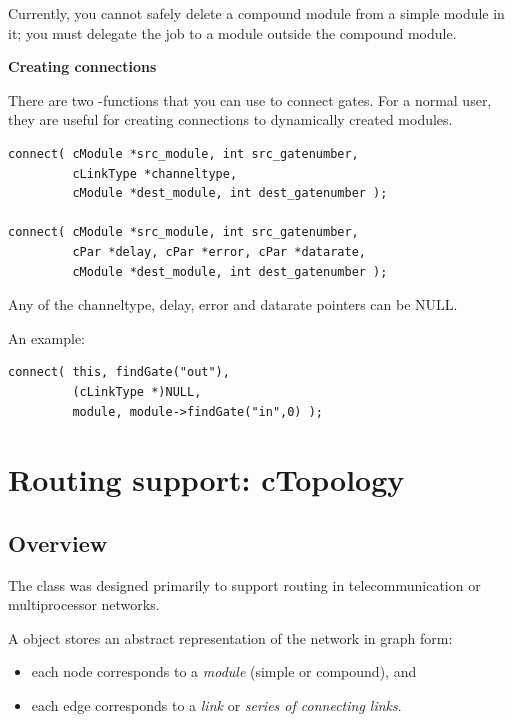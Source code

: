 Currently, you cannot safely delete a
compound module from a simple module
in it; you must delegate the job to a module outside the compound
module.


\textbf{Creating connections}


There are two -functions that you can use to connect
gates. For a normal user, they are useful for creating connections to
dynamically created modules.

\begin{Verbatim}
connect( cModule *src_module, int src_gatenumber,
         cLinkType *channeltype,
         cModule *dest_module, int dest_gatenumber );

connect( cModule *src_module, int src_gatenumber,
         cPar *delay, cPar *error, cPar *datarate,
         cModule *dest_module, int dest_gatenumber );
\end{Verbatim}


Any of the channeltype, delay, error and datarate pointers can 
be NULL.

An example:

\begin{Verbatim}
connect( this, findGate("out"),
         (cLinkType *)NULL,
         module, module->findGate("in",0) );
\end{Verbatim}





\section{Routing support: cTopology}

\subsection{Overview}

The  class was designed primarily to support
routing in telecommunication or multiprocessor
networks.

A  object stores an abstract representation of the
network in graph form:
\begin{itemize}
  \item{each  node corresponds to a \textit{module}
    (simple or compound), and}
  \item{each  edge corresponds to a \textit{link} or
    \textit{series of connecting links}.}
\end{itemize}

